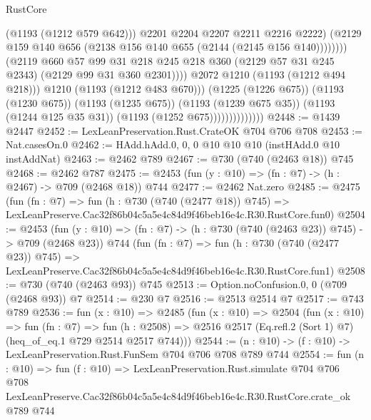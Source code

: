 \begin{lexlean}{RustCore}
\begin{coremodule}
                                                (@1193 (@1212 @579 @642)))
                                              @2201
                                              @2204
                                              @2207
                                              @2211
                                              @2216
                                              @2222)
                                            (@2129
                                              @159
                                              @140
                                              @656
                                              (@2138 @156 @140 @655 (@2144 (@2145 @156 @140))))))))
                                    (@2119
                                      @660
                                      @57
                                      @99
                                      @31
                                      @218
                                      @245
                                      @218
                                      @360
                                      (@2129 @57 @31 @245 @2343)
                                      (@2129 @99 @31 @360 @2301))))
                                @2072
                                @1210
                                (@1193 (@1212 @494 @218)))
                              @1210
                              (@1193 (@1212 @483 @670)))
                            (@1225 (@1226 @675))
                            (@1193 (@1230 @675))
                            (@1193 (@1235 @675))
                            (@1193 (@1239 @675 @35))
                            (@1193 (@1244 @125 @35 @31))
                            (@1193 (@1252 @675))))))))))))))
@2448 := @1439 @2447
@2452 := LexLeanPreservation.Rust.CrateOK @704 @706 @708
@2453 := Nat.casesOn.{0}
@2462 := HAdd.hAdd.{0, 0, 0} @10 @10 @10 (instHAdd.{0} @10 instAddNat)
@2463 := @2462 @789
@2467 := @730 (@740 (@2463 @18)) @745
@2468 := @2462 @787
@2475 := @2453 (fun (y : @10) => (fn : @7) -> (h : @2467) -> @709 (@2468 @18)) @744
@2477 := @2462 Nat.zero
@2485 := @2475
    (fun (fn : @7) =>
    fun (h : @730 (@740 (@2477 @18)) @745) =>
    LexLeanPreserve.Cac32f86b04c5a5e4c84d9f46beb16e4c.R30.RustCore.fun0)
@2504 := @2453
    (fun (y : @10) => (fn : @7) -> (h : @730 (@740 (@2463 @23)) @745) -> @709 (@2468 @23))
    @744
    (fun (fn : @7) =>
    fun (h : @730 (@740 (@2477 @23)) @745) =>
    LexLeanPreserve.Cac32f86b04c5a5e4c84d9f46beb16e4c.R30.RustCore.fun1)
@2508 := @730 (@740 (@2463 @93)) @745
@2513 := Option.noConfusion.{0, 0} (@709 (@2468 @93)) @7
@2514 := @230 @7
@2516 := @2513 @2514 @7
@2517 := @743 @789
@2536 := fun (x : @10) =>
  @2485
    (fun (x : @10) =>
    @2504
      (fun (x : @10) =>
      fun (fn : @7) =>
      fun (h : @2508) =>
      @2516 @2517 (Eq.refl.{2} (Sort 1) @7) (heq_of_eq.{1} @729 @2514 @2517 @744)))
@2544 := (n : @10) -> (f : @10) -> LexLeanPreservation.Rust.FunSem @704 @706 @708 @789 @744
@2554 := fun (n : @10) =>
  fun (f : @10) =>
  LexLeanPreservation.Rust.simulate
    @704
    @706
    @708
    LexLeanPreserve.Cac32f86b04c5a5e4c84d9f46beb16e4c.R30.RustCore.crate_ok
    @789
    @744
\end{coremodule}
\end{lexlean}
